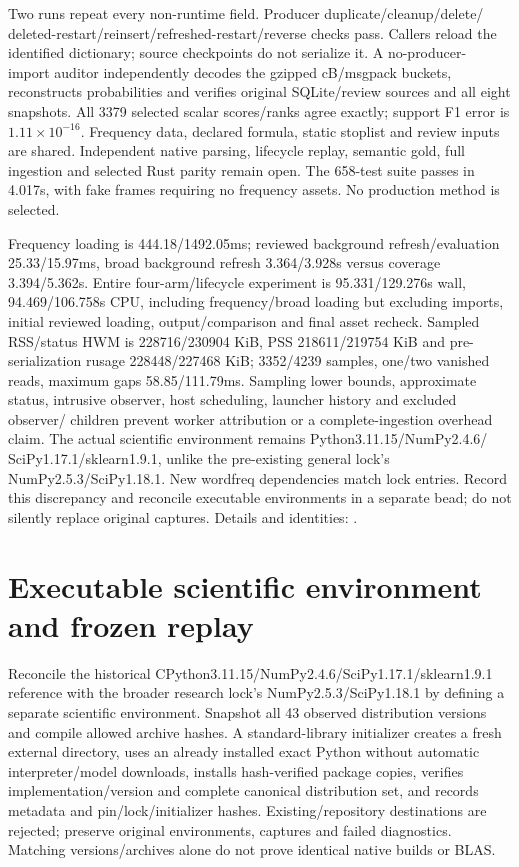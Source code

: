 \documentclass[11pt]{article}
\begin{document}
Two runs repeat every non-runtime field. Producer duplicate/cleanup/delete/
deleted-restart/reinsert/refreshed-restart/reverse checks pass. Callers reload
the identified dictionary; source checkpoints do not serialize it. A no-producer-
import auditor independently decodes the gzipped cB/msgpack buckets, reconstructs
probabilities and verifies original SQLite/review sources and all eight snapshots.
All 3379 selected scalar scores/ranks agree exactly; support F1 error is
$1.11\times10^{-16}$. Frequency data, declared formula, static stoplist and
review inputs are shared. Independent native parsing, lifecycle replay,
semantic gold, full ingestion and selected Rust parity remain open.
The 658-test suite passes in 4.017s, with fake frames requiring no frequency
assets. No production method is selected.

Frequency loading is 444.18/1492.05ms; reviewed background refresh/evaluation
25.33/15.97ms, broad background refresh 3.364/3.928s versus coverage
3.394/5.362s. Entire four-arm/lifecycle experiment is 95.331/129.276s wall,
94.469/106.758s CPU, including frequency/broad loading but excluding imports,
initial reviewed loading, output/comparison and final asset recheck. Sampled
RSS/status HWM is 228716/230904 KiB, PSS 218611/219754 KiB and
pre-serialization rusage 228448/227468 KiB; 3352/4239 samples, one/two vanished
reads, maximum gaps 58.85/111.79ms. Sampling lower bounds, approximate status,
intrusive observer, host scheduling, launcher history and excluded observer/
children prevent worker attribution or a complete-ingestion overhead claim.
The actual scientific environment remains Python3.11.15/NumPy2.4.6/
SciPy1.17.1/sklearn1.9.1, unlike the pre-existing general lock's
NumPy2.5.3/SciPy1.18.1. New wordfreq dependencies match lock entries. Record
this discrepancy and reconcile executable environments in a separate bead;
do not silently replace original captures. Details and identities:
.

\section{Executable scientific environment and frozen replay}
Reconcile the historical CPython3.11.15/NumPy2.4.6/SciPy1.17.1/sklearn1.9.1
reference with the broader research lock's NumPy2.5.3/SciPy1.18.1 by defining a
separate scientific environment. Snapshot all 43 observed distribution versions
and compile allowed archive hashes. A standard-library initializer creates a
fresh external directory, uses an already installed exact Python without
automatic interpreter/model downloads, installs hash-verified package copies,
verifies implementation/version and complete canonical distribution set, and
records metadata and pin/lock/initializer hashes. Existing/repository destinations
are rejected; preserve original environments, captures and failed diagnostics.
Matching versions/archives alone do not prove identical native builds or BLAS.
\end{document}
